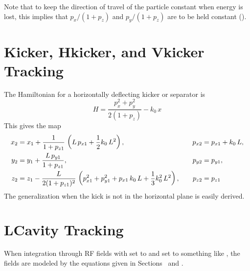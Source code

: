 Note that to keep the direction of travel of the particle constant when energy is lost, this implies
that $p_x/(1+p_z)$ and $p_y/(1+p_z)$ are to be held constant ().

\section{Kicker, Hkicker, and Vkicker Tracking}
\label{s:kicker.std}

The Hamiltonian for a horizontally deflecting kicker or separator is
\begin{equation}
  H = \frac{p_x^2 + p_y^2}{2 (1 + p_z)} - k_0 \, x 
\end{equation}
This gives the map
\begin{alignat}{2}
  x_2 &= x_1 + \frac{1}{1 + p_{z1}} \, \left( L \, p_{x1} + \frac{1}{2} k_0 \, L^2 \right), &
    p_{x2} &= p_{x1} + k_0 \, L, \nonumber \\
  y_2 &= y_1 + \frac{L \, p_{y1}}{1 + p_{z1}}, &
    p_{y2} &= p_{y1},  \\
  z_2 &= z_1 - \frac{L}{2 (1 + p_{z1})^2} \, 
    \left( p_{x1}^2 + p_{y1}^2 + p_{x1} \, k_0 \, L + \frac{1}{3} k_0^2 \, L^2 \right), \quad &
  p_{z2} &= p_{z1} \nonumber
\end{alignat}
The generalization when the kick is not in the horizontal plane is easily derived.

\section{LCavity Tracking}
\label{s:lcavity.std}

When integration through RF fields with  set to  and
 set to something like , the fields are modeled by the equations
given in Sections~ and .

